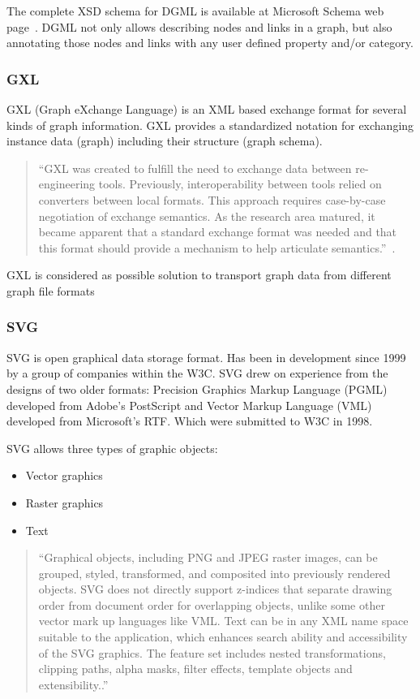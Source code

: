 The complete XSD schema for DGML is available at Microsoft Schema web page~\cite{DGML_XSD_URL}.
DGML not only allows describing nodes and links in a graph,
but also annotating those nodes and links with any user defined property and/or category.

\subsubsection{GXL}
GXL (Graph eXchange Language) is an XML based exchange format for several kinds of graph information.
GXL provides a standardized notation for exchanging instance data (graph) including their structure (graph schema).

\begin{quotation}
``GXL was created to fulfill the need to exchange data between re-engineering tools.
Previously, interoperability between tools relied on converters between local formats.
This approach requires case-by-case negotiation of exchange semantics.
As the research area matured, it became apparent that a standard exchange format
was needed and that this format should provide a mechanism to help articulate semantics.''~\cite{GXL}.
\end{quotation}

GXL is considered as possible solution to transport graph data from different graph file formats

\subsubsection{SVG}
SVG is open graphical data storage format. Has been in development since 1999 by a group of companies within the W3C. SVG drew on experience from the designs of two older formats: Precision Graphics Markup Language (PGML) developed from Adobe's PostScript and Vector Markup Language (VML) developed from Microsoft's RTF. Which were submitted to W3C in 1998.


SVG allows three types of graphic objects:
\begin{itemize}
\item Vector graphics
\item Raster graphics
\item Text
\end{itemize}

\begin{quotation}
``Graphical objects, including PNG and JPEG raster images, can be grouped, styled, transformed,
and composited into previously rendered objects. SVG does not directly support z-indices
that separate drawing order from document order for overlapping objects, unlike some other vector mark up languages like VML.
Text can be in any XML name space suitable to the application, which enhances search ability and accessibility of the SVG graphics.
The feature set includes nested transformations, clipping paths, alpha masks, filter effects, template objects and extensibility..''~\cite{SVG}
\end{quotation}

